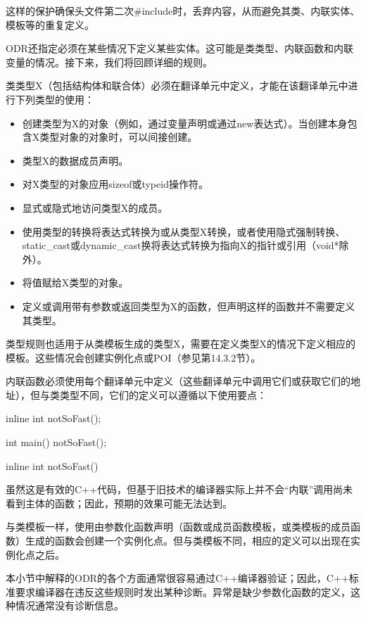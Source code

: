 这样的保护确保头文件第二次\#include时，丢弃内容，从而避免其类、内联实体、模板等的重复定义。

ODR还指定必须在某些情况下定义某些实体。这可能是类类型、内联函数和内联变量的情况。接下来，我们将回顾详细的规则。

类类型X（包括结构体和联合体）必须在翻译单元中定义，才能在该翻译单元中进行下列类型的使用：

\begin{itemize}
\item 
创建类型为X的对象（例如，通过变量声明或通过new表达式）。当创建本身包含X类型对象的对象时，可以间接创建。

\item 
类型X的数据成员声明。

\item 
对X类型的对象应用sizeof或typeid操作符。

\item 
显式或隐式地访问类型X的成员。

\item 
使用类型的转换将表达式转换为或从类型X转换，或者使用隐式强制转换、static\_cast或dynamic\_cast换将表达式转换为指向X的指针或引用（void*除外）。

\item 
将值赋给X类型的对象。

\item 
定义或调用带有参数或返回类型为X的函数，但声明这样的函数并不需要定义其类型。
\end{itemize}

类型规则也适用于从类模板生成的类型X，需要在定义类型X的情况下定义相应的模板。这些情况会创建实例化点或POI（参见第14.3.2节）。

内联函数必须使用每个翻译单元中定义（这些翻译单元中调用它们或获取它们的地址），但与类类型不同，它们的定义可以遵循以下使用要点：

\begin{cpp}
inline int notSoFast();

int main() {
	notSoFast();
}

inline int notSoFast() { }
\end{cpp}

虽然这是有效的C++代码，但基于旧技术的编译器实际上并不会“内联”调用尚未看到主体的函数；因此，预期的效果可能无法达到。

与类模板一样，使用由参数化函数声明（函数或成员函数模板，或类模板的成员函数）生成的函数会创建一个实例化点。但与类模板不同，相应的定义可以出现在实例化点之后。

本小节中解释的ODR的各个方面通常很容易通过C++编译器验证；因此，C++标准要求编译器在违反这些规则时发出某种诊断。异常是缺少参数化函数的定义，这种情况通常没有诊断信息。

